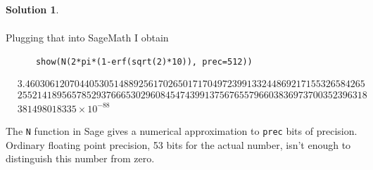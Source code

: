 \documentclass[10pt]{article}
\makeatletter
\theoremstyle{definition}
\newtheorem{soln}{Solution}
\newcommand{\boxspacing}{\kern\kvtcb@left@rule\kern\kvtcb@boxsep}
\newcommand{\prompt}[4]{
    \ttfamily\llap{{\color{#2}[#3]:\hspace{3pt}#4}}\vspace{-\baselineskip}
}
\makeatother
\begin{document}
\begin{soln}
\begin{enumerate}[label=(\alph*)]
\begin{align*}
          \end{align*}
          Plugging that into SageMath I obtain
          \begin{tcolorbox}[breakable, size=fbox, boxrule=1pt, pad at break*=1mm,colback=cellbackground, colframe=cellborder]
            \prompt{In}{incolor}{1}{\boxspacing}
            \begin{verbatim}
      show(N(2*pi*(1-erf(sqrt(2)*10)), prec=512))
              \end{verbatim}
          \end{tcolorbox}
          \begin{tcolorbox}[breakable, size=fbox, boxrule=.5pt, pad at break*=1mm, opacityfill=0]
            \prompt{Out}{outcolor}{1}{\boxspacing}
            \begin{align*}
               & 3.460306120704405305148892561702650171704972399133244869217155326584265 \\
               & 25521418956578529376665302960845474399137567655796603836973700352396318 \\
               & 381498018335 \times 10^{-88}
            \end{align*}
          \end{tcolorbox}
          The \verb|N| function in Sage gives a numerical approximation to \verb|prec| bits of precision. Ordinary floating point precision, 53 bits for 
          the actual number, isn't enough to distinguish this number from zero.
  \end{enumerate}
\end{soln}
\end{document}
